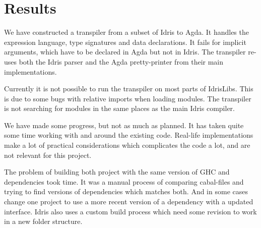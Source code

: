 \chapter{Results}

%



We have constructed a transpiler from a subset of Idris to Agda. It handles the
expression language, type signatures and data declarations.  It fails for
implicit arguments, which have to be declared in Agda but not in Idris. The
transpiler re-uses both the Idris parser and the Agda pretty-printer from their
main implementations.

Currently it is not possible to run the transpiler on most parts of IdrisLibs.
This is due to some bugs with relative imports when loading modules. The
transpiler is not searching for modules in the same places as the main Idris
compiler.

We have made some progress, but not as much as planned. It has taken quite some
time working with and around the existing code.  Real-life implementations make
a lot of practical considerations which complicates the code a lot, and are not
relevant for this project.


The problem of building both project with the same version of GHC and
dependencies took time. It was a manual process of comparing cabal-files and
trying to find versions of dependencies which matches both. And in some cases
change one project to use a more recent version of a dependency with a updated
interface. Idris also uses a custom build process which need some revision to
work in a new folder structure.

